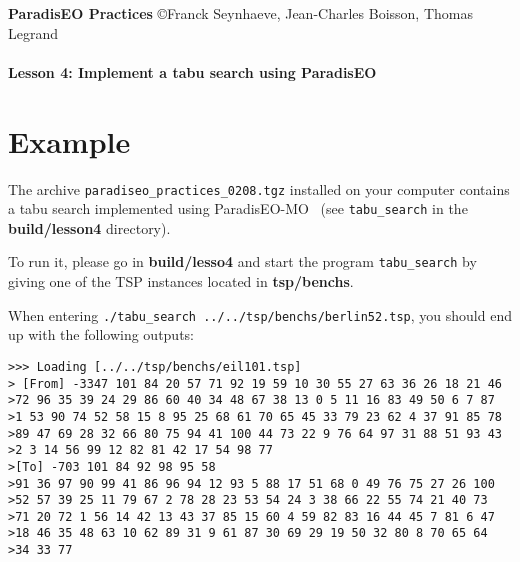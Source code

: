 \documentclass[a4paper]{article}
\begin{document}
\textbf{ParadisEO Practices}  {\copyright Franck Seynhaeve,
Jean-Charles Boisson, Thomas Legrand} \Large{\textbf{\\\\
Lesson 4: Implement a tabu search using ParadisEO}}

\normalsize

\vspace{-0,3cm}

\section{Example}

    The archive {\tt paradiseo\_practices\_0208.tgz} installed
    on your computer contains a tabu search implemented using ParadisEO-MO~
    (see {\tt tabu\_search} in the {\bf build/lesson4} directory).

    \medskip
    To run it, please go in {\bf build/lesso4} and start the program {\tt tabu\_search} by giving
    one of the TSP instances located in {\bf tsp/benchs}.


    \medskip
    When entering {\tt ./tabu\_search ../../tsp/benchs/berlin52.tsp}, you should end up with the
    following outputs:

    \smallskip
    \noindent
    \texttt{>>> Loading [../../tsp/benchs/eil101.tsp]}\\
    \texttt{> [From] -3347  101 84 20 57 71 92 19 59 10 30 55 27 63 36 26 18 21 46}\\
    \texttt{>72 96 35 39 24 29 86 60 40 34 48 67 38 13 0 5 11 16 83 49 50 6 7 87}\\
    \texttt{>1 53 90 74 52 58 15 8 95 25 68 61 70 65 45 33 79 23 62 4 37 91 85 78}\\
    \texttt{>89 47 69 28 32 66 80 75 94 41 100 44 73 22 9 76 64 97 31 88 51 93 43}\\
    \texttt{>2 3 14 56 99 12 82 81 42 17 54 98 77}\\
    \texttt{>[To] -703  101 84 92 98 95 58}\\
    \texttt{>91 36 97 90 99 41 86 96 94 12 93 5 88 17 51 68 0 49 76 75 27 26 100}\\
    \texttt{>52 57 39 25 11 79 67 2 78 28 23 53 54 24 3 38 66 22 55 74 21 40 73}\\
    \texttt{>71 20 72 1 56 14 42 13 43 37 85 15 60 4 59 82 83 16 44 45 7 81 6 47}\\
    \texttt{>18 46 35 48 63 10 62 89 31 9 61 87 30 69 29 19 50 32 80 8 70 65 64}\\
    \texttt{>34 33 77}\\
\end{document}
